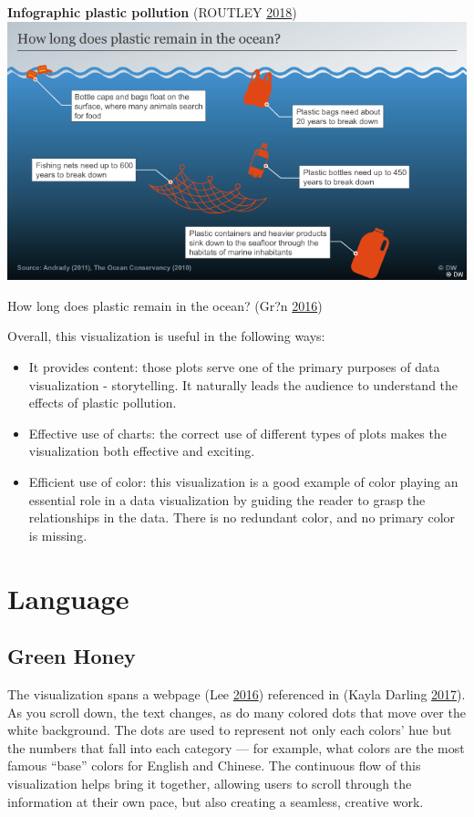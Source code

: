\documentclass[]{book}
\providecommand{\tightlist}{%
  \setlength{\itemsep}{0pt}\setlength{\parskip}{0pt}}
\begin{document}
\textbf{Infographic plastic pollution} (ROUTLEY
\protect\hyperlink{ref-plastic_pollution_infographics}{2018})
\includegraphics{images/ocean_plastic.png}

How long does plastic remain in the ocean? (Gr?n
\protect\hyperlink{ref-plastic_pollution_visualizations}{2016})

Overall, this visualization is useful in the following ways:

\begin{itemize}
\tightlist
\item
  It provides content: those plots serve one of the primary purposes of
  data visualization - storytelling. It naturally leads the audience to
  understand the effects of plastic pollution.
\item
  Effective use of charts: the correct use of different types of plots
  makes the visualization both effective and exciting.
\item
  Efficient use of color: this visualization is a good example of color
  playing an essential role in a data visualization by guiding the
  reader to grasp the relationships in the data. There is no redundant
  color, and no primary color is missing.
\end{itemize}

\section{Language}\label{language}

\subsection{Green Honey}\label{green-honey}

The visualization spans a webpage (Lee
\protect\hyperlink{ref-green_honey}{2016}) referenced in (Kayla Darling
\protect\hyperlink{ref-cool_data}{2017}). As you scroll down, the text
changes, as do many colored dots that move over the white background.
The dots are used to represent not only each colors' hue but the numbers
that fall into each category --- for example, what colors are the most
famous ``base'' colors for English and Chinese. The continuous flow of
this visualization helps bring it together, allowing users to scroll
through the information at their own pace, but also creating a seamless,
creative work.
\end{document}

